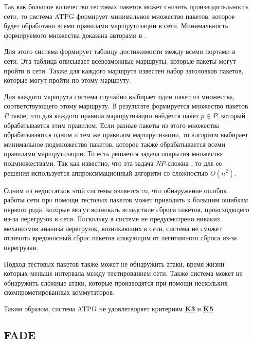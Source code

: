 \documentclass[../thesis.tex]{subfiles}
\begin{document}
Так как большое количество тестовых пакетов может снизить производительность сети, то система ATPG формирует минимальное множество пакетов, которое будет обработано всеми правилами маршрутизации в сети.
Минимальность формируемого множества доказана авторами в \cite{zeng2012automatic}.

Для этого система формирует таблицу достижимости между всеми портами в сети.
Эта таблица описывает всевозможные маршруты, которые пакеты могут пройти в сети.
Также для каждого маршрута известен набор заголовков пакетов, которые могут пройти по этому маршруту.

Для каждого маршрута система случайно выбирает один пакет из множества, соответствующего этому маршруту.
В результате формируется множество пакетов $P$ такое, что для каждого правила маршрутизации найдется пакет $p\in P$, который обрабатывается этим правилом.
Если разные пакеты из этого множества обрабатываются одним и тем же правилом маршрутизации, то алгоритм выбирает минимальное подмножество пакетов, которое также обрабатывается всеми правилами маршрутизации.
То есть решается задача покрытия множества подмножествами.
Так как известно, что эта задача \textit{NP}-сложна \cite{garey2002computers, cormen2009introduction}, то для ее решения используется аппроксимационный алгоритм со сложностью $O(n^2)$.

Одним из недостатков этой системы является то, что обнаружение ошибок работы сети при помощи тестовых пакетов может приводить к большим ошибкам первого рода, которые могут возникать вследствие сброса пакетов, происходящего из-за перегрузок в сети.
Поскольку в системе не предусмотрено никаких механизмов анализа перегрузок, возникающих в сети, система не сможет отличить вредоносный сброс пакетов атакующим от легитимного сброса из-за перегрузки.

Подход тестовых пакетов также может не обнаружить атаки, время жизни которых меньше интервала между тестированием сети.
Также система может не обнаружить сложные атаки, которые производятся при помощи нескольких скомпрометированных коммутаторов.

{
\hypersetup{linkcolor=black}

Таким образом, система ATPG не удовлетворяет критериям \hyperref[criterion:K3]{\textbf{K3}} и \hyperref[criterion:K5]{\textbf{K5}}
}

\subsection{FADE} \label{subsection:fade}
\end{document}
